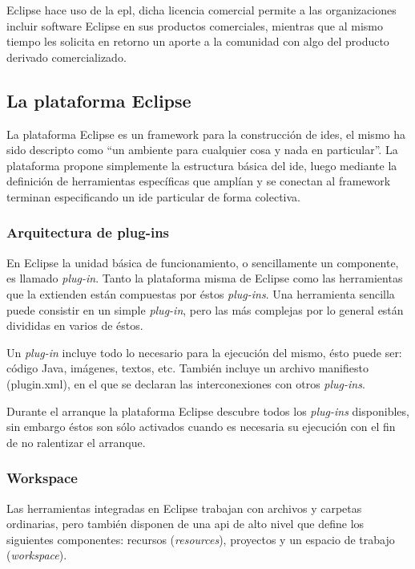 \documentclass[a4paper,12pt,oneside,spanish]{book}
\begin{document}
\textsf{Eclipse} hace uso de la \gls{epl}, dicha licencia comercial permite a las organizaciones incluir software \textsf{Eclipse} en sus productos comerciales, mientras que al mismo tiempo les solicita en retorno un aporte a la comunidad con algo del producto derivado comercializado.


\subsection{La plataforma Eclipse}
\label{subsec:PlatEclipse}

La plataforma \textsf{Eclipse} es un framework para la construcción de \glspl{ide}, el mismo ha sido descripto como ``un ambiente para cualquier cosa y nada en particular''. La plataforma propone simplemente la estructura básica del \gls{ide}, luego mediante la definición de herramientas específicas que amplían y se conectan al framework terminan especificando un \gls{ide} particular de forma colectiva.


\subsubsection{Arquitectura de plug-ins}

En \textsf{Eclipse} la unidad básica de funcionamiento, o sencillamente un componente, es llamado \textit{plug-in}. Tanto la plataforma misma de \textsf{Eclipse} como las herramientas que la extienden están compuestas por éstos \textit{plug-ins}. Una herramienta sencilla puede consistir en un simple \textit{plug-in}, pero las más complejas por lo general están divididas en varios de éstos.

Un \textit{plug-in} incluye todo lo necesario para la ejecución del mismo, ésto puede ser: código \textsf{Java}, imágenes, textos, etc. También incluye un archivo manifiesto (\textsf{plugin.xml}), en el que se declaran las interconexiones con otros \textit{plug-ins}.

Durante el arranque la plataforma \textsf{Eclipse} descubre todos los \textit{plug-ins} disponibles, sin embargo éstos son sólo activados cuando es necesaria su ejecución con el fin de no ralentizar el arranque.


\subsubsection{Workspace}

Las herramientas integradas en \textsf{Eclipse} trabajan con archivos y carpetas ordinarias, pero también disponen de una \gls{api} de alto nivel que define los siguientes componentes: recursos (\textit{resources}), proyectos y un espacio de trabajo (\textit{workspace}).
\end{document}
